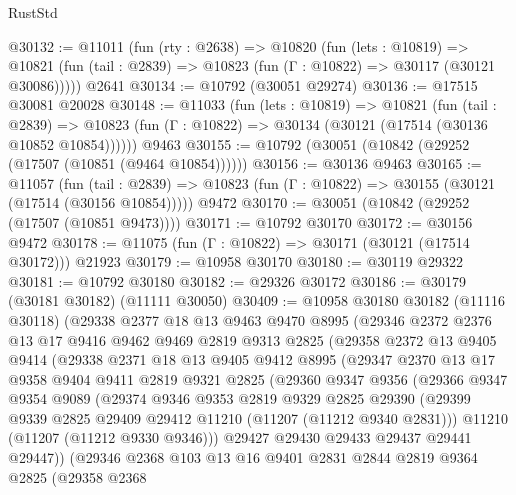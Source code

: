 \begin{lexlean}{RustStd}
\begin{coremodule}
@30132 := @11011
    (fun (rty : @2638) =>
    @10820
      (fun (lets : @10819) =>
      @10821 (fun (tail : @2839) => @10823 (fun (Γ : @10822) => @30117 (@30121 @30086)))))
    @2641
@30134 := @10792 (@30051 @29274)
@30136 := @17515 @30081 @20028
@30148 := @11033
    (fun (lets : @10819) =>
    @10821
      (fun (tail : @2839) =>
      @10823 (fun (Γ : @10822) => @30134 (@30121 (@17514 (@30136 @10852 @10854))))))
    @9463
@30155 := @10792 (@30051 (@10842 (@29252 (@17507 (@10851 (@9464 @10854))))))
@30156 := @30136 @9463
@30165 := @11057
    (fun (tail : @2839) => @10823 (fun (Γ : @10822) => @30155 (@30121 (@17514 (@30156 @10854)))))
    @9472
@30170 := @30051 (@10842 (@29252 (@17507 (@10851 @9473))))
@30171 := @10792 @30170
@30172 := @30156 @9472
@30178 := @11075 (fun (Γ : @10822) => @30171 (@30121 (@17514 @30172))) @21923
@30179 := @10958 @30170
@30180 := @30119 @29322
@30181 := @10792 @30180
@30182 := @29326 @30172
@30186 := @30179 (@30181 @30182) (@11111 @30050)
@30409 := @10958
    @30180
    @30182
    (@11116 @30118)
    (@29338
      @2377
      @18
      @13
      @9463
      @9470
      @8995
      (@29346
        @2372
        @2376
        @13
        @17
        @9416
        @9462
        @9469
        @2819
        @9313
        @2825
        (@29358
          @2372
          @13
          @9405
          @9414
          (@29338
            @2371
            @18
            @13
            @9405
            @9412
            @8995
            (@29347
              @2370
              @13
              @17
              @9358
              @9404
              @9411
              @2819
              @9321
              @2825
              (@29360
                @9347
                @9356
                (@29366
                  @9347
                  @9354
                  @9089
                  (@29374
                    @9346
                    @9353
                    @2819
                    @9329
                    @2825
                    @29390
                    (@29399 @9339 @2825 @29409 @29412 @11210 (@11207 (@11212 @9340 @2831)))
                    @11210
                    (@11207 (@11212 @9330 @9346)))
                  @29427
                  @29430
                  @29433
                  @29437
                  @29441
                  @29447))
              (@29346
                @2368
                @103
                @13
                @16
                @9401
                @2831
                @2844
                @2819
                @9364
                @2825
                (@29358
                  @2368

\end{coremodule}
\end{lexlean}
